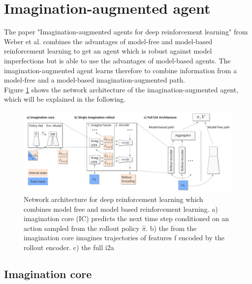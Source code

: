 \section{Imagination-augmented agent} 
\label{sec:i2a} 
 
The paper "Imagination-augmented agents for deep reinforcement learning" from Weber et al. \cite{I2A} combines the advantages of model-free and model-based reinforcement learning to get an agent which is robust against model imperfections but is able to use the advantages of model-based agents.
The imagination-augmented agent learns therefore to combine information from a model-free and a model-based imagination-augmented path.\\

 
Figure \ref{fig:i2a_architecture} shows the network architecture of the imagination-augmented agent, which will be explained in the following.

\begin{figure}[H] 
  \centering 
   
  \includegraphics[width=\columnwidth]{./Images/i2a_architecture.png} 
  \caption{Network architecture for deep reinforcement learning which combines model free and model based reinforcement learning. a) imagination core (IC) predicts the next time step conditioned on an action sampled from the rollout policy $\hat{\pi}$. b) the from the imagination core imagines trajectories of features f encoded by the rollout encoder. c) the full i2a} 
  \label{fig:i2a_architecture} 
\end{figure}

 
\subsection{Imagination core}

